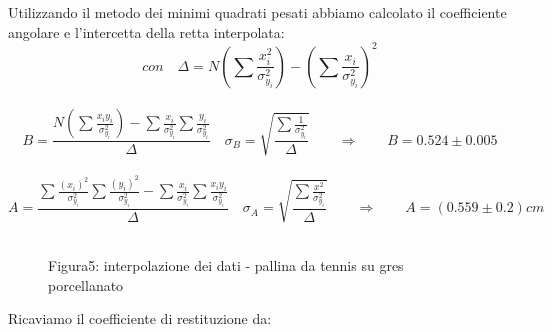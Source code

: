 \documentclass[a4paper]{article}
\theoremstyle{definition}
\begin{document}
	\noindent Utilizzando il metodo dei minimi quadrati pesati abbiamo calcolato il coefficiente angolare e l'intercetta della retta interpolata:\\
	\[ con\quad\Delta = N(\sum \frac{x_{i}^{2}}{\sigma _{y_{i}}^{2}})-(\sum \frac{x_{i}}{\sigma _{y_{i}}^{2}})^{2}\]\\
	\[B = \frac{N(\sum\frac{x_{i}y_{i}}{\sigma _{y_{i}}^{2}})-\sum\frac{x_{i}}{\sigma _{y_{i}}^{2}}\sum\frac{y_{i}}{\sigma _{y_{i}}^{2}}}{\Delta } \quad
	\sigma _{B} = \sqrt{\frac{\sum \frac{1}{\sigma _{y_{i}}^{2}}}{\Delta}} \qquad
	\Rightarrow \qquad B = 0.524 \pm 0.005\]\\
	\[A = \frac{\sum \frac{(x_{i})^{2}}{\sigma _{y_{i}}^{2}}\sum \frac{(y_{i})^{2}}{\sigma _{y_{i}}^{2}}-\sum \frac{x_{i}}{\sigma _{y_{i}}^{2}}\sum \frac{x_{i}y_{i}}{\sigma _{y_{i}}^{2}}}{\Delta} \quad  \sigma _{A} = \sqrt{\frac{\sum \frac{x^{2}}{\sigma _{y_{i}}^{2}}}{\Delta}} \qquad \Rightarrow \qquad A = (0.559 \pm 0.2) cm\]\\
	
	\begin{figure}[!ht]
		\captionsetup{labelformat = empty}
		\caption{Figura5: interpolazione dei dati - pallina da tennis su gres porcellanato}
	\end{figure}
	
	Ricaviamo il coefficiente di restituzione da:
	
\end{document}
